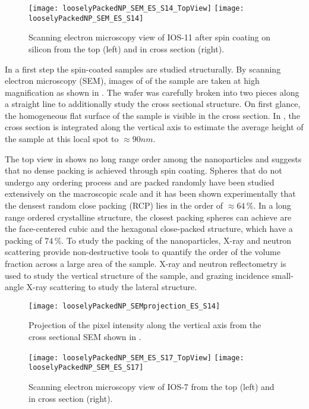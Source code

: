 \documentclass[\main/dresen_thesis.tex]{subfiles}
\begin{document}
  \label{sec:looselyPackedNS:layers:sem}
  \begin{figure}[tb]
    \centering
    \texttt{[image: looselyPackedNP\_SEM\_ES\_S14\_TopView]}
    \texttt{[image: looselyPackedNP\_SEM\_ES\_S14]}
    \caption{\label{fig:looselyPackedNP:nuclearStructure:sem}Scanning electron microscopy view of IOS-11 after spin coating on silicon from the top (left) and in cross section (right).}
  \end{figure}
  In a first step the spin-coated samples are studied structurally.
  By scanning electron microscopy (SEM), images of of the sample are taken at high magnification as shown in .
  The wafer was carefully broken into two pieces along a straight line to additionally study the cross sectional structure.
  On first glance, the homogeneous flat surface of the sample is visible in the cross section.
  In , the cross section is integrated along the vertical axis to estimate the average height of the sample at this local spot to $\approx 90 \unit{nm}$.

  The top view in  shows no long range order among the nanoparticles and suggests that no dense packing is achieved through spin coating.
  Spheres that do not undergo any ordering process and are packed randomly have been studied extensively on the macroscopic scale \cite{Torquato_2000_IsRan} and it has been shown experimentally that the densest random close packing (RCP) lies in the order of $\approx 64 \, \%$.
  In a long range ordered crystalline structure, the closest packing spheres can achieve are the face-centered cubic and the hexagonal close-packed structure, which have a packing of $74 \, \%$.
  To study the packing of the nanoparticles, X-ray and neutron scattering provide non-destructive tools to quantify the order of the volume fraction across a large area of the sample.
  X-ray and neutron reflectometry is used to study the vertical structure of the sample, and grazing incidence small-angle X-ray scattering to study the lateral structure.

  \begin{figure}[tb]
    \centering
    \texttt{[image: looselyPackedNP\_SEMprojection\_ES\_S14]}
    \caption{\label{fig:looselyPackedNP:nuclearStructure:semProjection}Projection of the pixel intensity along the vertical axis from the cross sectional SEM shown in .}
  \end{figure}

  \begin{figure}[tb]
    \centering
    \texttt{[image: looselyPackedNP\_SEM\_ES\_S17\_TopView]}
    \texttt{[image: looselyPackedNP\_SEM\_ES\_S17]}
    \caption{\label{fig:looselyPackedNP:nuclearStructure:semIOS7}Scanning electron microscopy view of IOS-7 from the top (left) and in cross section (right).}
  \end{figure}
\end{document}
